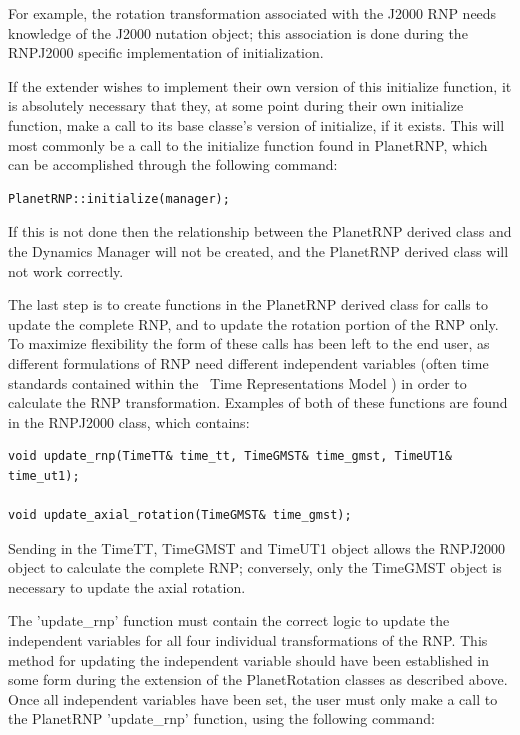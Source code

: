For example, the rotation transformation associated with the J2000 RNP
needs knowledge of the J2000 nutation object; this association is done
during the RNPJ2000 specific implementation of initialization.

If the extender wishes to implement their own version of this initialize
function, it is absolutely necessary that they, at some point during
their own initialize function, make a call to its base classe's version of
initialize, if it exists. This will most commonly be a call to the
initialize function found in PlanetRNP, which can be accomplished
through the following command:

\begin{verbatim}
PlanetRNP::initialize(manager);
\end{verbatim}

If this is not done then the relationship between the PlanetRNP derived class
and the Dynamics Manager will not be created, and the PlanetRNP derived class
will not work correctly.

The last step is to create functions in the PlanetRNP derived class for calls to
update the complete RNP, and to update the rotation portion of the RNP
only. To maximize flexibility the form of these calls has been left to the
end user, as different formulations of RNP need different independent variables
(often time standards contained within the \JEODid\ Time Representations Model
\cite{dynenv:TIME}) in order to calculate the RNP transformation. Examples of
both of these functions are found in the RNPJ2000 class, which contains:

\begin{verbatim}
void update_rnp(TimeTT& time_tt, TimeGMST& time_gmst, TimeUT1& time_ut1);

void update_axial_rotation(TimeGMST& time_gmst);
\end{verbatim}

Sending in the TimeTT, TimeGMST and TimeUT1 object allows the RNPJ2000 object
to calculate the complete RNP; conversely, only the TimeGMST object is
necessary to update the axial rotation.

The 'update\_rnp' function must contain the correct logic to update the
independent variables for all four individual transformations of the RNP.
This method for updating the independent variable should have been established
in some form during the extension of the PlanetRotation classes as described
above. Once all independent variables have been set, the user must only make
a call to the PlanetRNP 'update\_rnp' function, using the following
command:

